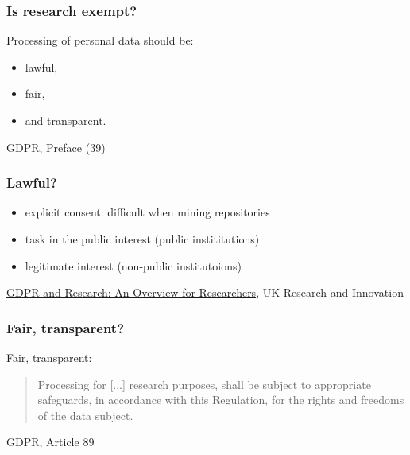 \documentclass[17pt,aspectratio=169,hyperref={pdfusetitle,colorlinks,allcolors=olive}]{beamer}
\begin{document}
\begin{frame}[fragile]
  \frametitle{Is research exempt?}

  Processing of personal data should be:

  \begin{itemize}
  \item lawful,
  \item fair,
  \item and transparent.
  \end{itemize}

  \begin{flushright}
    GDPR, Preface (39)
  \end{flushright}

\end{frame}

\begin{frame}[fragile]
  \frametitle{Lawful?}

  \begin{itemize}
  \item explicit consent: difficult when mining repositories
  \item task in the public interest (public instititutions)
  \item legitimate interest (non-public institutoions)
  \end{itemize}

  \begin{flushright}
    \href{https://www.ukri.org/files/about/policy/ukri-gdpr-faqs-pdf}{GDPR and Research: An Overview for Researchers}, UK Research and Innovation
  \end{flushright}
\end{frame}

\begin{frame}[fragile]
  \frametitle{Fair, transparent?}

  Fair, transparent:
  
  \begin{quote}
  Processing for [...] research purposes, shall be subject to appropriate safeguards, in accordance with this Regulation, for the rights and freedoms of
the data subject.
  \end{quote}

  \begin{flushright}
    GDPR, Article 89
  \end{flushright}
\end{frame}
\end{document}
